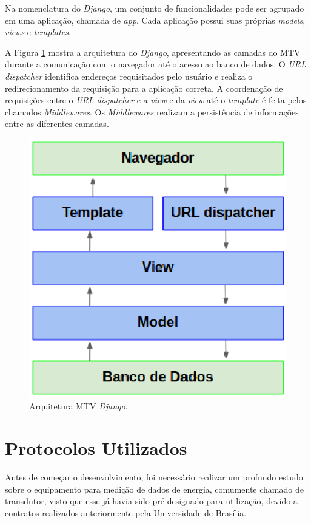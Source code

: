     Na nomenclatura do \textit{Django}, um conjunto de funcionalidades pode ser agrupado em uma aplicação, chamada de \textit{app}. Cada aplicação possui suas próprias \textit{models}, \textit{views} e \textit{templates}.

    A Figura \ref{django-arq} mostra a arquitetura do \textit{Django}, apresentando as camadas do MTV durante a comunicação com o navegador até o acesso ao banco de dados. O \textit{URL dispatcher} identifica endereços requisitados pelo usuário e realiza o redirecionamento da requisição para a aplicação correta. A coordenação de requisições entre o \textit{URL dispatcher} e a \textit{view} e da \textit{view} até o \textit{template} é feita pelos chamados \textit{Middlewares}. Os \textit{Middlewares} realizam a persistência de informações entre as diferentes camadas.

    \begin{figure}[h]
        \centering
        \includegraphics[keepaspectratio=true,scale=0.5]{figuras/django-arquitetura.eps}
        \caption{Arquitetura MTV \textit{Django}.}
        \label{django-arq}
    \end{figure}

\section{Protocolos Utilizados}
Antes de começar o desenvolvimento, foi necessário realizar um profundo estudo sobre o equipamento para medição de dados de energia, comumente chamado de transdutor, visto que esse já havia sido pré-designado para utilização, devido a contratos realizados anteriormente pela Universidade de Brasília.

